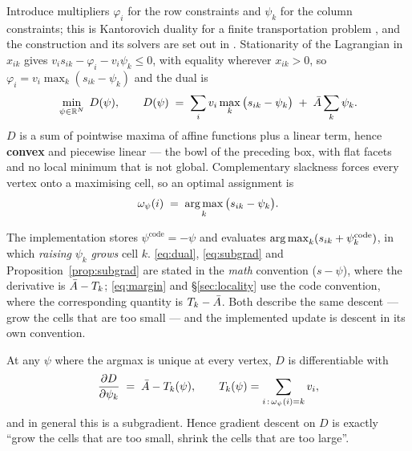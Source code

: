\documentclass[11pt,a4paper]{article}
\begin{document}
Introduce multipliers $\varphi_i$ for the row constraints and $\psi_k$ for the
column constraints; this is Kantorovich duality for a finite transportation
problem \cite{villani2003topics}, and the construction and its solvers are set out
in \cite{peyre2019computational}. Stationarity of the Lagrangian in $x_{ik}$ gives
$v_i s_{ik} - \varphi_i - v_i \psi_k \le 0$, with equality wherever $x_{ik} > 0$,
so $\varphi_i = v_i \max_k (s_{ik} - \psi_k)$ and the dual is
\begin{equation}
  \min_{\psi \in \mathbb{R}^N} \; D(\psi), \qquad
  D(\psi) \;=\; \sum_i v_i \max_k \big( s_{ik} - \psi_k \big) \;+\; \bar{A} \sum_k \psi_k .
  \label{eq:dual}
\end{equation}
$D$ is a sum of pointwise maxima of affine functions plus a linear term, hence
\textbf{convex} and piecewise linear --- the bowl of the preceding box, with flat
facets and no local minimum that is not global. Complementary slackness forces every vertex
onto a maximising cell, so an optimal assignment is
\begin{equation}
  \omega_\psi(i) \;=\; \operatorname*{arg\,max}_k \big( s_{ik} - \psi_k \big) .
  \label{eq:shifted}
\end{equation}

\begin{remark}
The implementation stores $\psi^{\mathrm{code}} = -\psi$ and evaluates
$\operatorname*{arg\,max}_k ( s_{ik} + \psi^{\mathrm{code}}_k )$, in which \emph{raising} $\psi_k$
\emph{grows} cell $k$. \eqref{eq:dual}, \eqref{eq:subgrad} and
Proposition~\ref{prop:subgrad} are stated in the \emph{math} convention
($s - \psi$), where the derivative is $\bar{A} - T_k$; \eqref{eq:margin} and
\S\ref{sec:locality} use the code convention, where the corresponding quantity is
$T_k - \bar{A}$. Both describe the same descent --- grow the cells that are too
small --- and the implemented update is descent in its own convention.
\end{remark}

\begin{prop}
\label{prop:subgrad}
At any $\psi$ where the argmax is unique at every vertex, $D$ is differentiable
with
\begin{equation}
  \frac{\partial D}{\partial \psi_k} \;=\; \bar{A} - T_k(\psi),
  \qquad T_k(\psi) = \sum_{i \,:\, \omega_\psi(i) = k} v_i ,
  \label{eq:subgrad}
\end{equation}
and in general this is a subgradient. Hence gradient descent on $D$ is exactly
``grow the cells that are too small, shrink the cells that are too large''.
\end{prop}
\end{document}
